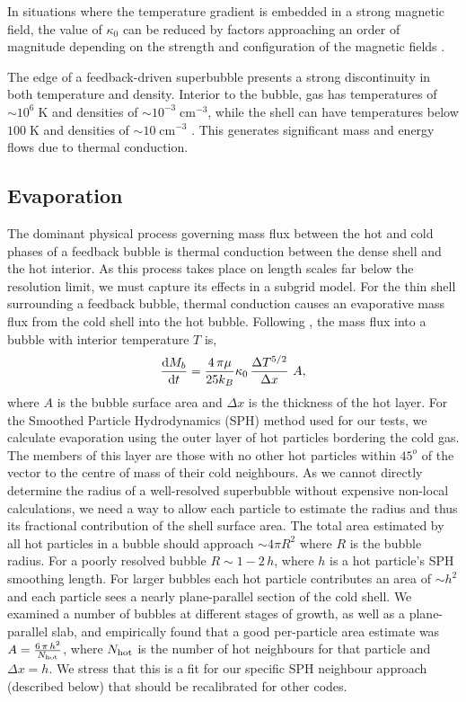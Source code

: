 In situations where the temperature gradient is embedded in a strong magnetic
field, the value of $\kappa_0$  can be reduced by factors approaching an order
of magnitude depending on the strength and configuration of the magnetic fields
\citep{Cowie1977}.

The edge of a feedback-driven superbubble presents a strong discontinuity in
both temperature and density.  Interior to the bubble, gas has temperatures of
$\sim 10^6\;\mathrm{K}$ and densities of $\sim10^{-3}\;\mathrm{cm^{-3}}$, while
the shell can have temperatures below $100\;\mathrm{K}$ and densities of $\sim
10\;\mathrm{cm^{-3}}$ \citep{Chevalier1974}.  This generates significant mass
and energy flows due to thermal conduction.

\subsection{Evaporation}
The dominant physical process governing mass flux between the hot and cold
phases of a feedback bubble is thermal conduction between the dense shell and
the hot interior.   As this process takes place on length scales far below the
resolution limit, we must capture its effects in a subgrid model.  For the thin
shell surrounding a feedback bubble, thermal conduction causes an evaporative
mass flux from the cold shell into the hot bubble.  Following
\citet{MacLow1988}, the mass flux into a bubble with interior temperature $T$
is,
\begin{equation}\label{massflux}
    \frac{{\rm d }M_b}{{\rm d}t} = \frac{4\,\pi\mu}{25k_B}\kappa_0\,\frac{\Delta T^{5/2}}{\Delta x}\ A,
\end{equation}
where $ A$ is the bubble surface area and $\Delta x$ is the thickness of
the hot layer.  For the Smoothed Particle Hydrodynamics (SPH) method used for
our tests, we calculate evaporation using the outer layer of hot particles
bordering the cold gas.  The members of this layer are those with no other hot
particles within $45^o$ of the vector to the centre of mass of their cold
neighbours.  As we cannot directly determine the radius of a well-resolved
superbubble without expensive non-local calculations, we need a way to allow
each particle to estimate the radius and thus its fractional contribution of the
shell surface area.  The total area estimated by all hot particles in a bubble
should approach $\sim 4\pi R^2$ where $R$ is the bubble radius.  For a poorly
resolved bubble $R \sim 1-2\,h$, where $h$ is a hot particle's SPH smoothing
length.  For larger bubbles each hot particle contributes an area of $\sim h^2$
and each particle sees a nearly plane-parallel section of the cold shell.  We
examined a number of bubbles at different stages of growth, as well as a
plane-parallel slab, and empirically found that a good per-particle area
estimate was $A = \frac{6\,\pi\,h^2}{N_{\rm hot}}$, where $N_{\rm
hot}$ is the number of hot neighbours for that particle and $\Delta x = h$.  We
stress that this is a fit for our specific SPH neighbour approach (described
below) that should be recalibrated for other codes.

